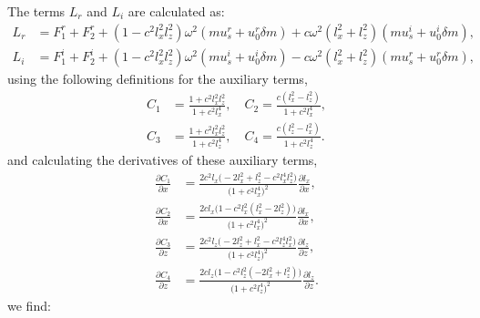 \documentclass[authoryear, preprint, 12pt]{elsarticle}
\begin{document}
	The terms ${L}_r$ and ${L}_i$ are calculated as:
	\begin{align}
		{L}_r &= F_{1}^r + F_{2}^r +\left( 1 - c^2 l_x^2 l_z^2 \right) \omega^2 \left( m  u_s^r +   u_0^r \delta m \right) 
		+ c \omega^2 \left( l_x^2 + l_z^2 \right) \left( m  u_s^i +   u_0^i \delta m\right), \\
		{L}_i &= F_{1}^i + F_{2}^i  +\left( 1 - c^2 l_x^2 l_z^2 \right) \omega^2 \left( m  u_s^i +  u_0^i \delta m\right) 
		- c \omega^2 \left( l_x^2 + l_z^2 \right) \left( m  u_s^r +   u_0^r \delta m\right),
	\end{align}
using the following definitions for the auxiliary terms,
\begin{equation}
	\begin{aligned}
		C_1 &= \frac{1 + c^2 l_x^2 l_z^2}{1 + c^2 l_x^4}, \quad
		C_2 = \frac{c (l_x^2 - l_z^2)}{1 + c^2 l_x^4}, \\
		C_3 &= \frac{1 + c^2 l_x^2 l_z^2}{1 + c^2 l_z^4}, \quad
		C_4 = \frac{c ( l_z^2-l_x^2 )}{1 + c^2 l_z^4}.
	\end{aligned}
\end{equation}
	and calculating the derivatives of these auxiliary terms,
	\begin{equation}
	\begin{aligned}
		\frac{\partial C_1}{\partial x} &= \frac{2 c^2 l_x \big(-2 l_x^2 + l_z^2 - c^2 l_x^4 l_z^2 \big) }{\big(1 + c^2 l_x^4\big)^2}\frac{\partial l_x}{\partial x}, \\
		\frac{\partial C_2}{\partial x} &= \frac{2 c l_x \big(1 - c^2 l_x^2 (l_x^2 - 2 l_z^2)\big) }{\big(1 + c^2 l_x^4\big)^2}\frac{\partial l_x}{\partial x}, \\
		\frac{\partial C_3}{\partial z} &= \frac{2 c^2 l_z \big(-2 l_z^2 + l_x^2  - c^2 l_z^4 l_x^2\big) }{\big(1 + c^2 l_z^4\big)^2}\frac{\partial l_z}{\partial z}, \\
		\frac{\partial C_4}{\partial z} &= \frac{2 c l_z \big(1 - c^2 l_z^2 (-2 l_x^2 + l_z^2)\big) }{\big(1 + c^2 l_z^4\big)^2}\frac{\partial l_z}{\partial z}.
	\end{aligned}
	\end{equation}
	we find:
\end{document}
